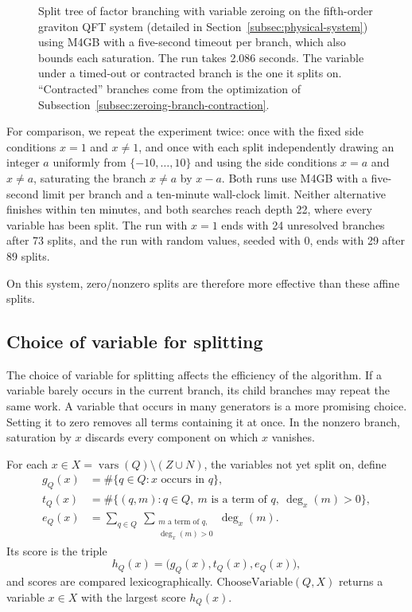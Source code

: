 \begin{figure}[pos=htbp]
  \centering
  \resizebox{\textwidth}{!}{}
  \caption{Split tree of factor branching with variable zeroing on the
    fifth-order graviton QFT system (detailed in
    Section~\ref{subsec:physical-system}) using M4GB with a five-second
    timeout per branch, which also bounds each saturation. The run takes
    2.086 seconds. The variable under a
    timed-out or contracted branch is the one it splits on. ``Contracted''
    branches come from the optimization of
    Subsection~\ref{subsec:zeroing-branch-contraction}.
  }
  \label{fig:variable_zeroing_tree}
\end{figure}

For comparison, we repeat the experiment twice: once with the fixed side
conditions $x=1$ and $x\neq1$, and once with each split independently drawing
an integer $a$ uniformly from $\{-10,\ldots,10\}$ and using the side conditions
$x=a$ and $x\neq a$, saturating the branch $x\neq a$ by $x-a$. Both runs use
M4GB with a five-second limit per branch
and a ten-minute wall-clock limit. Neither alternative finishes within ten
minutes, and both searches reach depth 22, where every variable has been
split. The run with $x=1$ ends with 24 unresolved branches after 73 splits,
and the run with random values, seeded with $0$, ends with 29 after 89
splits.

On this system, zero/nonzero splits are therefore more effective than these
affine splits.

\subsection{Choice of variable for splitting}
\label{subsec:zeroing-variable-choice}

The choice of variable for splitting affects the efficiency of the algorithm.
If a variable barely occurs in the current branch, its child branches may
repeat the same work. A variable that occurs in many generators is a more
promising choice. Setting it to zero removes all terms containing it at once.
In the nonzero branch, saturation by $x$ discards every component on which
$x$ vanishes.

For each $x\in X = \operatorname{vars}(Q)\setminus(Z\cup N)$, the
variables not yet split on, define
\begin{align*}
  g_Q(x) &= \#\{q\in Q : x\text{ occurs in }q\},\\
  t_Q(x) &= \#\{(q,m) : q\in Q,\ m\text{ is a term of }q,\ \deg_x(m) > 0\},\\
  e_Q(x) &= \sum_{q\in Q}\ \sum_{\substack{m\text{ a term of
  }q,\\ \deg_x(m) > 0}} \deg_x(m).
\end{align*}
Its score is the triple
\[
  h_Q(x)=\bigl(g_Q(x),t_Q(x),e_Q(x)\bigr),
\]
and scores are compared lexicographically.
$\mathrm{ChooseVariable}(Q,X)$ returns a variable $x\in X$ with the
largest score $h_Q(x)$.

